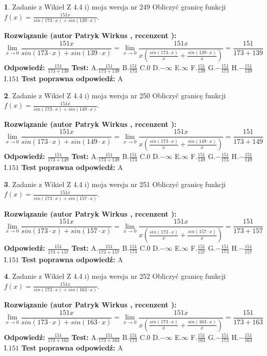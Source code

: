 \documentclass[12pt, a4paper]{article}
\theoremstyle{definition} %
\newtheorem{zad}{}
\newcommand{\zadStart}[1]{\begin{zad}#1\newline}
\newcommand{\zadStop}{\end{zad}}
\newcommand{\rozwStart}[2]{\noindent \textbf{Rozwiązanie (autor #1 , recenzent #2): }\newline}
\newcommand{\rozwStop}{\newline}
\newcommand{\odpStart}{\noindent \textbf{Odpowiedź:}\newline}
\newcommand{\odpStop}{\newline}
\newcommand{\testStart}{\noindent \textbf{Test:}\newline}
\newcommand{\testStop}{\newline}
\newcommand{\kluczStart}{\noindent \textbf{Test poprawna odpowiedź:}\newline}
\newcommand{\kluczStop}{\newline}
\begin{document}
\zadStart{Zadanie z Wikieł Z 4.4 i) moja wersja nr 249}
Obliczyć granicę funkcji $f(x)=\frac{151x}{sin(173\cdot x) +sin(139\cdot x)}$.
\zadStop
\rozwStart{Patryk Wirkus}{}
$$\lim\limits_{x\to 0}\frac{151x}{sin(173\cdot x) +sin(139\cdot x)}=\lim\limits_{x\to 0}\frac{151x}{x(\frac{sin(173\cdot x)}{x}+\frac{sin(139\cdot x)}{x})}=\frac{151}{173+139}$$
\rozwStop
\odpStart
$\frac{151}{173+139}$
\odpStop
\testStart
A.$\frac{151}{173+139}$
B.$\frac{151}{173}$
C.$0$
D.$-\infty$
E.$\infty$
F.$\frac{151}{139}$
G.$-\frac{151}{173}$
H.$-\frac{151}{139}$
I.$151$
\testStop
\kluczStart
A
\kluczStop



\zadStart{Zadanie z Wikieł Z 4.4 i) moja wersja nr 250}
Obliczyć granicę funkcji $f(x)=\frac{151x}{sin(173\cdot x) +sin(149\cdot x)}$.
\zadStop
\rozwStart{Patryk Wirkus}{}
$$\lim\limits_{x\to 0}\frac{151x}{sin(173\cdot x) +sin(149\cdot x)}=\lim\limits_{x\to 0}\frac{151x}{x(\frac{sin(173\cdot x)}{x}+\frac{sin(149\cdot x)}{x})}=\frac{151}{173+149}$$
\rozwStop
\odpStart
$\frac{151}{173+149}$
\odpStop
\testStart
A.$\frac{151}{173+149}$
B.$\frac{151}{173}$
C.$0$
D.$-\infty$
E.$\infty$
F.$\frac{151}{149}$
G.$-\frac{151}{173}$
H.$-\frac{151}{149}$
I.$151$
\testStop
\kluczStart
A
\kluczStop



\zadStart{Zadanie z Wikieł Z 4.4 i) moja wersja nr 251}
Obliczyć granicę funkcji $f(x)=\frac{151x}{sin(173\cdot x) +sin(157\cdot x)}$.
\zadStop
\rozwStart{Patryk Wirkus}{}
$$\lim\limits_{x\to 0}\frac{151x}{sin(173\cdot x) +sin(157\cdot x)}=\lim\limits_{x\to 0}\frac{151x}{x(\frac{sin(173\cdot x)}{x}+\frac{sin(157\cdot x)}{x})}=\frac{151}{173+157}$$
\rozwStop
\odpStart
$\frac{151}{173+157}$
\odpStop
\testStart
A.$\frac{151}{173+157}$
B.$\frac{151}{173}$
C.$0$
D.$-\infty$
E.$\infty$
F.$\frac{151}{157}$
G.$-\frac{151}{173}$
H.$-\frac{151}{157}$
I.$151$
\testStop
\kluczStart
A
\kluczStop



\zadStart{Zadanie z Wikieł Z 4.4 i) moja wersja nr 252}
Obliczyć granicę funkcji $f(x)=\frac{151x}{sin(173\cdot x) +sin(163\cdot x)}$.
\zadStop
\rozwStart{Patryk Wirkus}{}
$$\lim\limits_{x\to 0}\frac{151x}{sin(173\cdot x) +sin(163\cdot x)}=\lim\limits_{x\to 0}\frac{151x}{x(\frac{sin(173\cdot x)}{x}+\frac{sin(163\cdot x)}{x})}=\frac{151}{173+163}$$
\rozwStop
\odpStart
$\frac{151}{173+163}$
\odpStop
\testStart
A.$\frac{151}{173+163}$
B.$\frac{151}{173}$
C.$0$
D.$-\infty$
E.$\infty$
F.$\frac{151}{163}$
G.$-\frac{151}{173}$
H.$-\frac{151}{163}$
I.$151$
\testStop
\kluczStart
A
\kluczStop
\end{document}
